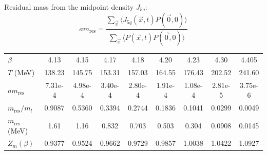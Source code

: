 \documentclass[10pt, aspectratio=169]{beamer} %
\begin{document}
\begin{frame}
\vfill
Residual mass from the midpoint density $J_{5q}$:
\[ am_{\text{res}} = \frac{\sum_{\vec{x}} \langle J_{5q}(\vec{x}, t) P(\vec{0}, 0) \rangle}{\sum_{\vec{x}} \langle P(\vec{x}, t) P(\vec{0}, 0) \rangle} \]

\vspace{0.6em}
{\setlength{\leftskip}{0pt}
\centering
\tiny
\setlength{\tabcolsep}{5.5pt}
\renewcommand{\arraystretch}{1.25}
\begin{tabular}{lcccccccc}
    \toprule
    $\beta$ & 4.13 & 4.15 & 4.17 & 4.18 & 4.20 & 4.23 & 4.30 & 4.405 \\
    $T$ (MeV) & 138.23 & 145.75 & 153.31 & 157.03 & 164.55 & 176.43 & 202.52 & 241.60 \\
    \midrule
    $am_{\text{res}}$ & 7.31e-4 & 4.98e-4 & 3.40e-4 & 2.80e-4 & 1.91e-4 & 1.08e-4 & 2.81e-5 & 3.75e-6 \\
    $m_{\text{res}}/m_l$ & 0.9087 & 0.5360 & 0.3394 & 0.2744 & 0.1836 & 0.1041 & 0.0299 & 0.0049 \\
    $m_{\text{res}}$ (MeV) & 1.61 & 1.16 & 0.832 & 0.703 & 0.503 & 0.304 & 0.0908 & 0.0145 \\
    $Z_m(\beta)$ & 0.9377 & 0.9524 & 0.9662 & 0.9729 & 0.9857 & 1.0038 & 1.0422 & 1.0927 \\
    \bottomrule
\end{tabular}\par}
\vfill
\end{frame}
\end{document}
